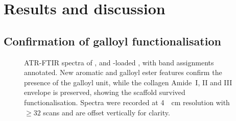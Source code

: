 %
%
%
%
\section{Results and discussion}
\label{sec:results}

\subsection{Confirmation of galloyl functionalisation}
\label{sec:results-functionalisation}

\begin{figure}[htbp]
  \centering
  \caption[ATR-FTIR spectra with band assignments]{ATR-FTIR spectra of \RAWOSS{}, \TAOSS{} and \PbII{}-loaded \TAOSS{}, with band assignments annotated. New aromatic  and galloyl ester features confirm the presence of the galloyl unit, while the collagen Amide~I, II and III envelope is preserved, showing the scaffold survived functionalisation. Spectra were recorded at \SI{4}{\per\centi\metre} resolution with $\geq 32$ scans and are offset vertically for clarity.}
  \label{fig:ftir}
\end{figure}

